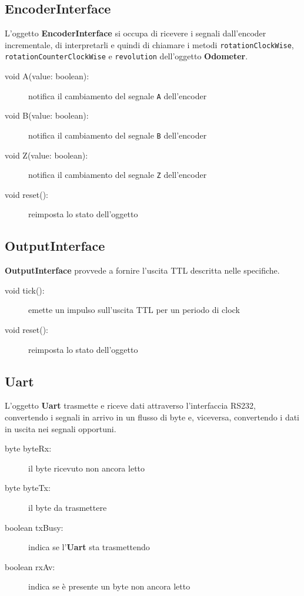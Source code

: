 \documentclass [11pt,a4paper,oneside]{article}
\begin{document}
\subsection{EncoderInterface}
L'oggetto \textbf{EncoderInterface} si occupa di ricevere i segnali
dall'encoder incrementale, di interpretarli e quindi di chiamare i
metodi \texttt{rotationClockWise}, \texttt{rotationCounterClockWise}
e \texttt{revolution} dell'oggetto \textbf{Odometer}.

\begin{description}
\item[void A(value: boolean):] notifica il cambiamento del segnale \texttt{A}
    dell'encoder
\item[void B(value: boolean):] notifica il cambiamento del segnale \texttt{B}
    dell'encoder
\item[void Z(value: boolean):] notifica il cambiamento del segnale \texttt{Z}
    dell'encoder
\item[void reset():] reimposta lo stato dell'oggetto
\end{description}

\subsection{OutputInterface}
\textbf{OutputInterface} provvede a fornire l'uscita TTL descritta nelle
specifiche.

\begin{description}
\item[void tick():] emette un impulso sull'uscita TTL per un periodo di clock
\item[void reset():] reimposta lo stato dell'oggetto
\end{description}

\subsection{Uart}
L'oggetto \textbf{Uart} trasmette e riceve dati attraverso l'interfaccia RS232,
convertendo i segnali in arrivo in un flusso di byte e, viceversa, convertendo
i dati in uscita nei segnali opportuni.

\begin{description}
\item[byte byteRx:] il byte ricevuto non ancora letto
\item[byte byteTx:] il byte da trasmettere
\item[boolean txBusy:] indica se l'\textbf{Uart} sta trasmettendo
\item[boolean rxAv:] indica se è presente un byte non ancora letto
\end{description}
\end{document}
